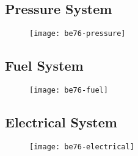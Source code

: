 \newpage


\subsection{Pressure System}

\begin{figure}[H]
\begin{center}
\texttt{[image: be76-pressure]}
\end{center}
\end{figure}


\subsection{Fuel System}

\begin{figure}[H]
\begin{center}
\texttt{[image: be76-fuel]}
\end{center}
\end{figure}


\subsection{Electrical System}

\begin{figure}[H]
\begin{center}
\texttt{[image: be76-electrical]}
\end{center}
\end{figure}

